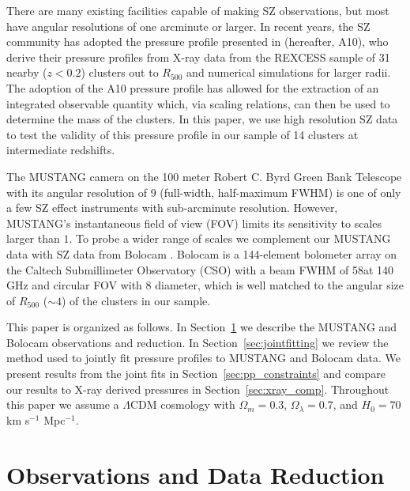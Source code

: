 \documentclass[iop,numberedappendix,apj]{emulateapj}
\begin{document}
There are many existing facilities capable of making SZ observations, but most have
angular resolutions of one arcminute or larger. In recent years, the SZ community has adopted the pressure profile
presented in \citet{arnaud2010} (hereafter, A10), who derive their pressure profiles from X-ray data from the 
REXCESS sample of 31 nearby ($z < 0.2$) clusters out to $R_{500}$ and numerical simulations for larger radii. The
adoption of the A10 pressure profile has allowed for the extraction of an integrated observable quantity which,
via scaling relations, can then be used to determine the mass of the clusters. In this paper, we use high resolution
SZ data to test the validity of this pressure profile in our sample of 14 clusters at intermediate redshifts.

The MUSTANG camera \citep{dicker2008}
on the 100 meter Robert C. Byrd Green Bank Telescope \citep[GBT, ][]{jewell2004} with its angular resolution of 9\asec 
(full-width, half-maximum FWHM) is one of only a few SZ effect instruments with sub-arcminute resolution.
However, MUSTANG's instantaneous field of view (FOV) limits its sensitivity to scales larger than $1$\amin. 
To probe a wider range of scales we complement our MUSTANG data with SZ data from Bolocam \citep{glenn1998}. 
Bolocam is a 144-element bolometer
array on the Caltech Submillimeter Observatory (CSO) with a beam FWHM of 58\asecs at 140 GHz and circular FOV with 8\amins 
diameter, which is well matched to the angular size of $R_{500}$ ($\sim 4$\amin) of the clusters in our sample. 

This paper is organized as follows. In Section~\ref{sec:obs} we describe the MUSTANG and Bolocam observations and reduction. 
In Section~\ref{sec:jointfitting} we review the method used to jointly fit pressure profiles to MUSTANG and Bolocam data. We
present results from the joint fits in Section~\ref{sec:pp_constraints} and compare our results to X-ray derived pressures 
in Section~\ref{sec:xray_comp}. 
Throughout this paper we assume a $\Lambda$CDM cosmology with $\Omega_m = 0.3$, $\Omega_{\lambda} = 0.7$, and $H_0 = 70$ 
km s$^{-1}$ Mpc$^{-1}$.

\section{Observations and Data Reduction}
\label{sec:obs}
\end{document}
